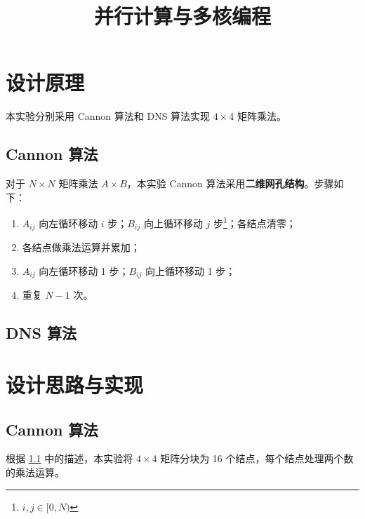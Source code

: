 \documentclass{zjureport-zh}
\title{并行计算与多核编程}
\begin{document}
\makecover


\section{设计原理}
\par 本实验分别采用 Cannon 算法和 DNS 算法实现 $4 \times 4$ 矩阵乘法。

\subsection{Cannon 算法} \label{cannon}
\par 对于 $N \times N$ 矩阵乘法 $A \times B$，本实验 Cannon 算法采用\textbf{二维网孔结构}。步骤如下：
\begin{enumerate}[label=\roman*), itemindent=2em]
	\item $A_{ij}$ 向左循环移动 $i$ 步；$B_{ij}$ 向上循环移动 $j$ 步\footnote{$i,j \in [0,N)$}；各结点清零； \label{cannon1}
	\item 各结点做乘法运算并累加；\label{cannon2}
	\item $A_{ij}$ 向左循环移动 1 步；$B_{ij}$ 向上循环移动 1 步；\label{cannon3}
	\item 重复 $N-1$ 次。
\end{enumerate}

\subsection{DNS 算法}


\section{设计思路与实现}

\subsection{Cannon 算法}
\par 根据 \ref{cannon} 中的描述，本实验将 $4 \times 4$ 矩阵分块为 16 个结点，每个结点处理两个数的乘法运算。
\end{document}
